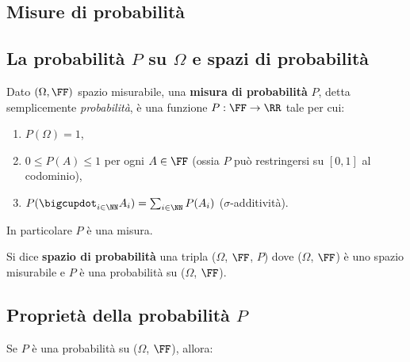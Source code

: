 \begin{multicols*}{2}
    \section{Misure di probabilità}

    \subsection{La probabilità \texorpdfstring{$P$}{P} su \texorpdfstring{$\Omega$}{Ω} e spazi di probabilità}

    \begin{definition}
        Dato $(\Omega, \FF)$ spazio misurabile, una \textbf{misura
        di probabilità} $P$, detta semplicemente \textit{probabilità},
        è una funzione $P : \FF \to \RR$ tale per cui:

        \begin{enumerate}[(i.)]
            \item $P(\Omega) = 1$,
            \item $0 \leq P(A) \leq 1$ per ogni $A \in \FF$ (ossia $P$ può restringersi su $[0, 1]$ al codominio),
            \item $P(\bigcupdot_{i \in \NN} A_i) = \sum_{i \in \NN} P(A_i)$ ($\sigma$-additività).
        \end{enumerate}

        In particolare $P$ è una misura.
    \end{definition}

    \begin{definition}
        Si dice \textbf{spazio di probabilità} una tripla
        ($\Omega$, $\FF$, $P$) dove ($\Omega$, $\FF$) è
        uno spazio misurabile e $P$ è una
        probabilità su ($\Omega$, $\FF$).
    \end{definition}

    \subsection{Proprietà della probabilità \texorpdfstring{$P$}{P}}

    \begin{proposition}[Proprietà di $P$]
        Se $P$ è una probabilità su ($\Omega$, $\FF$), allora:


\end{proposition}
\end{multicols*}
